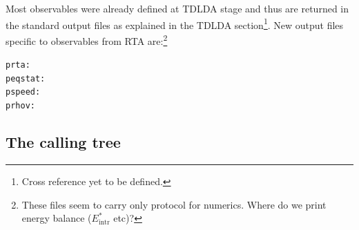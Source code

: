 \documentclass[final,1p]{elsarticle}
\newcommand{\PGRfoot}[1]{{\color{blue}\footnote{\color{blue} #1}}}
\begin{document}
Most observables were already defined at TDLDA stage and thus
are returned in the standard output files as explained in the TDLDA
section\PGRfoot{Cross reference yet to be defined.}. New output files
specific to observables from RTA are:\PGRfoot{These
  files seem to carry only protocol for numerics. Where do we
  print energy balance ($E_\mathrm{intr}^*$ etc)?}
\begin{description}
\item[\tt prta:]
\item[\tt peqstat:]
\item[\tt pspeed:]
\item[\tt prhov:]
\end{description}

\subsection{The calling tree}
\label{eq:treeRTA}
\end{document}
